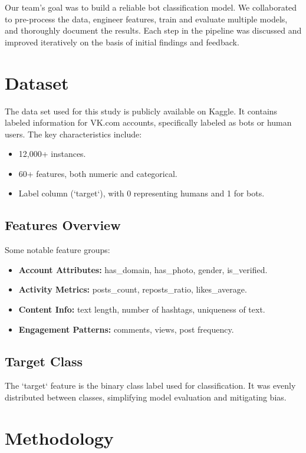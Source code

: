\documentclass[conference]{IEEEtran}
\begin{document}
Our team’s goal was to build a reliable bot classification model. We collaborated to pre-process the data, engineer features, train and evaluate multiple models, and thoroughly document the results. Each step in the pipeline was discussed and improved iteratively on the basis of initial findings and feedback.

\section{Dataset}
The data set used for this study is publicly available on Kaggle\cite{b1}. It contains labeled information for VK.com accounts, specifically labeled as bots or human users. The key characteristics include:

\begin{itemize}
    \item 12,000+ instances.
    \item 60+ features, both numeric and categorical.
    \item Label column (`target`), with 0 representing humans and 1 for bots.
\end{itemize}

\subsection{Features Overview}
Some notable feature groups:
\begin{itemize}
    \item \textbf{Account Attributes:} has\_domain, has\_photo, gender, is\_verified.
    \item \textbf{Activity Metrics:} posts\_count, reposts\_ratio, likes\_average.
    \item \textbf{Content Info:} text length, number of hashtags, uniqueness of text.
    \item \textbf{Engagement Patterns:} comments, views, post frequency.
\end{itemize}

\subsection{Target Class}
The `target` feature is the binary class label used for classification. It was evenly distributed between classes, simplifying model evaluation and mitigating bias.

\section{Methodology}
\end{document}
